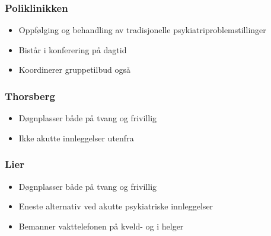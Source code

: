 \documentclass[11pt]{report} %
\begin{document}
                        \subsubsection{Poliklinikken}\label{sec:org_ddps_poli}
                          \begin{itemize}
                            \item Oppfølging og behandling av tradisjonelle psykiatriproblemstillinger\\
                            \item Bistår i konferering på dagtid\\
                            \item Koordinerer gruppetilbud også\\
                          \end{itemize}
                        \subsubsection{Thorsberg}\label{sec:org_ddps_thorsberg}
                          \begin{itemize}
                            \item Døgnplasser både på tvang og frivillig\\
                            \item Ikke akutte innleggelser utenfra\\
                            \end{itemize}
                        \subsubsection{Lier}\label{sec:org_ddps_lier}
                          \begin{itemize}
                            \item Døgnplasser både på tvang og frivillig\\
                            \item Eneste alternativ ved akutte psykiatriske innleggelser\\
                            \item Bemanner vakttelefonen på kveld- og i helger\\
                          \end{itemize}  
\end{document}
